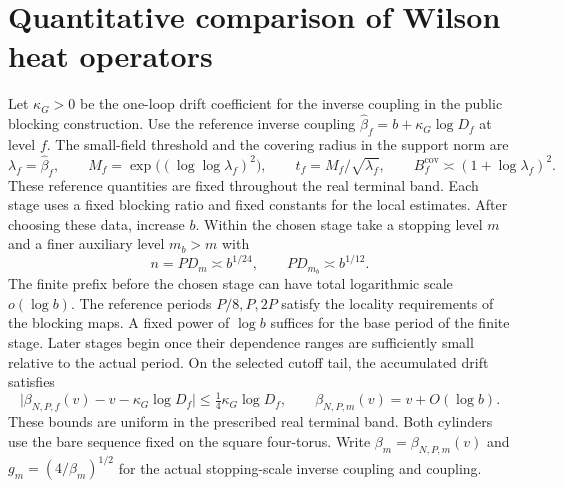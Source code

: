 \documentclass[11pt,a4paper]{article}
\numberwithin{equation}{section}
\begin{document}
\section{Quantitative comparison of Wilson heat operators}
\label{sec:kernel-comparison}

Let \(\kappa_G>0\) be the one-loop drift coefficient for the inverse coupling in the public blocking construction. Use the reference inverse coupling \(\widehat\beta_f=b+\kappa_G\log D_f\) at level \(f\). The small-field threshold and the covering radius in the support norm are
\[
 \lambda_f=\widehat\beta_f,\qquad M_f=\exp\bigl((\log\log\lambda_f)^2\bigr),\qquad
 t_f=M_f/\sqrt{\lambda_f},\qquad B_f^{\mathrm{cov}}\asymp(1+\log\lambda_f)^2.
\]
These reference quantities are fixed throughout the real terminal band. Each stage uses a fixed blocking ratio and fixed constants for the local estimates. After choosing these data, increase \(b\). Within the chosen stage take a stopping level \(m\) and a finer auxiliary level \(m_b>m\) with
\begin{equation}
 n=PD_m\asymp b^{1/24},\qquad PD_{m_b}\asymp b^{1/12}.
 \label{eq:paper-stops}
\end{equation}
The finite prefix before the chosen stage can have total logarithmic scale \(o(\log b)\). The reference periods \(P/8,P,2P\) satisfy the locality requirements of the blocking maps. A fixed power of \(\log b\) suffices for the base period of the finite stage. Later stages begin once their dependence ranges are sufficiently small relative to the actual period. On the selected cutoff tail, the accumulated drift satisfies
\begin{equation}
 \big|\beta_{N,P,f}(v)-v-\kappa_G\log D_f\big|
 \le \tfrac14\kappa_G\log D_f,\qquad
 \beta_{N,P,m}(v)=v+O(\log b).
 \label{eq:paper-coupling}
\end{equation}
These bounds are uniform in the prescribed real terminal band. Both cylinders use the bare sequence fixed on the square four-torus. Write \(\beta_m=\beta_{N,P,m}(v)\) and \(g_m=(4/\beta_m)^{1/2}\) for the actual stopping-scale inverse coupling and coupling.
\end{document}
